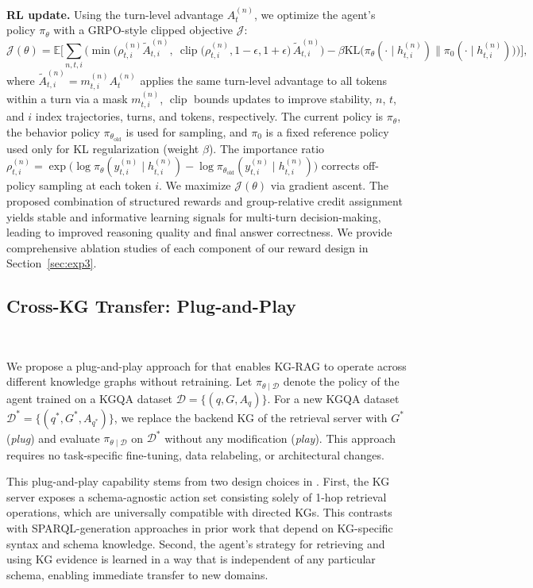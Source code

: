 \noindent \textbf{RL update.} Using the turn-level advantage $A_t^{(n)}$, we optimize the agent's policy $\pi_\theta$ with a GRPO-style clipped objective $\mathcal{J}$:
\[
\mathcal{J}(\theta)=\mathbb{E}\!\Bigg[\sum_{n,t,i}
\Big(
\min\!\Big(\rho_{t,i}^{(n)}\widetilde{A}_{t,i}^{(n)},\ \operatorname{clip}\big(\rho_{t,i}^{(n)},1-\epsilon,1+\epsilon\big)\,\widetilde{A}_{t,i}^{(n)}\Big)
-\beta\mathrm{KL}\!\big(\pi_\theta(\cdot\mid h_{t,i}^{(n)})\|\pi_{0}(\cdot\mid h_{t,i}^{(n)})\big)
\Big)
\Bigg],
\]
where $\widetilde{A}_{t,i}^{(n)}=m_{t,i}^{(n)}A_t^{(n)}$ applies the same turn-level advantage to all tokens within a turn via a mask $m_{t,i}^{(n)}$, $\operatorname{clip}$ bounds updates to improve stability, $n$, $t$, and $i$ index trajectories, turns, and tokens, respectively. 
The current policy is $\pi_\theta$, the behavior policy $\pi_{\theta_{\text{old}}}$ is used for sampling, and $\pi_0$ is a fixed reference policy used only for KL regularization (weight $\beta$). The importance ratio
$\rho_{t,i}^{(n)}=\exp\!\big(\log \pi_\theta(y_{t,i}^{(n)}\!\mid h_{t,i}^{(n)})-\log \pi_{\theta_{\text{old}}}(y_{t,i}^{(n)}\!\mid h_{t,i}^{(n)})\big)$ corrects off-policy sampling at each token $i$. We maximize $\mathcal{J}(\theta)$ via gradient ascent. The proposed combination of structured rewards and group-relative credit assignment yields stable and informative learning signals for multi-turn decision-making, leading to improved reasoning quality and final answer correctness. We provide comprehensive ablation studies of each component of our reward design in Section~\ref{sec:exp3}.


\subsection{Cross-KG Transfer: Plug-and-Play}~\label{sec:plug_and_play}
\vspace{-.1in}

We propose a plug-and-play approach for \framework{} that enables KG-RAG to operate across different knowledge graphs without retraining. Let \(\pi_{\theta \mid \mathcal{D}}\) denote the policy of the \framework{} agent trained on a KGQA dataset \(\mathcal{D}=\{(q,G,A_q)\}\). For a new KGQA dataset \(\mathcal{D}^*=\{(q^*,G^*,A_{q^*})\}\), we replace the backend KG of the retrieval server with \(G^*\) (\emph{plug}) and evaluate \(\pi_{\theta \mid \mathcal{D}}\) on \(\mathcal{D}^*\) without any modification (\emph{play}). This approach requires no task-specific fine-tuning, data relabeling, or architectural changes. 

This plug-and-play capability stems from two design choices in \framework{}. First, the KG server exposes a schema-agnostic action set consisting solely of 1-hop retrieval operations, which are universally compatible with directed KGs. This contrasts with SPARQL-generation approaches in prior work that depend on KG-specific syntax and schema knowledge. Second, the agent’s strategy for retrieving and using KG evidence is learned in a way that is independent of any particular schema, enabling immediate transfer to new domains.



